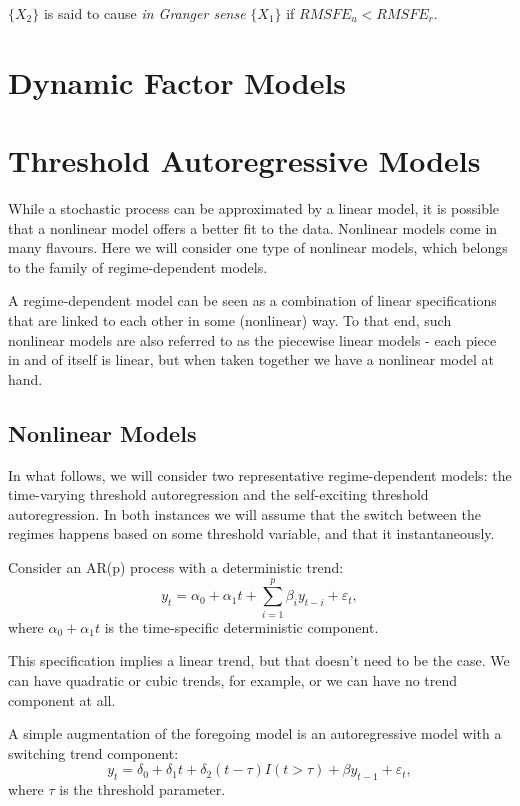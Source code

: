 \documentclass[
  12pt,
  oneside]{book}
\begin{document}
\(\{X_2\}\) is said to cause \emph{in Granger sense} \(\{X_1\}\) if \(RMSFE_{u} < RMSFE_{r}\).

\hypertarget{dynamic-factor-models}{%
\chapter{Dynamic Factor Models}\label{dynamic-factor-models}}

\hypertarget{threshold-autoregressive-models}{%
\chapter{Threshold Autoregressive Models}\label{threshold-autoregressive-models}}

While a stochastic process can be approximated by a linear model, it is possible that a nonlinear model offers a better fit to the data. Nonlinear models come in many flavours. Here we will consider one type of nonlinear models, which belongs to the family of regime-dependent models.

A regime-dependent model can be seen as a combination of linear specifications that are linked to each other in some (nonlinear) way. To that end, such nonlinear models are also referred to as the piecewise linear models - each piece in and of itself is linear, but when taken together we have a nonlinear model at hand.

\hypertarget{nonlinear-models}{%
\section{Nonlinear Models}\label{nonlinear-models}}

In what follows, we will consider two representative regime-dependent models: the time-varying threshold autoregression and the self-exciting threshold autoregression. In both instances we will assume that the switch between the regimes happens based on some threshold variable, and that it instantaneously.

Consider an AR(p) process with a deterministic trend: \[y_t = \alpha_0 + \alpha_1 t + \sum_{i=1}^{p}\beta_i y_{t-i} + \varepsilon_t,\] where \(\alpha_0 + \alpha_1 t\) is the time-specific deterministic component.

This specification implies a linear trend, but that doesn't need to be the case. We can have quadratic or cubic trends, for example, or we can have no trend component at all.

A simple augmentation of the foregoing model is an autoregressive model with a switching trend component: \[y_t = \delta_{0} + \delta_{1} t + \delta_{2}(t-\tau)I(t>\tau) + \beta y_{t-1} + \varepsilon_t,\] where \(\tau\) is the threshold parameter.
\end{document}
